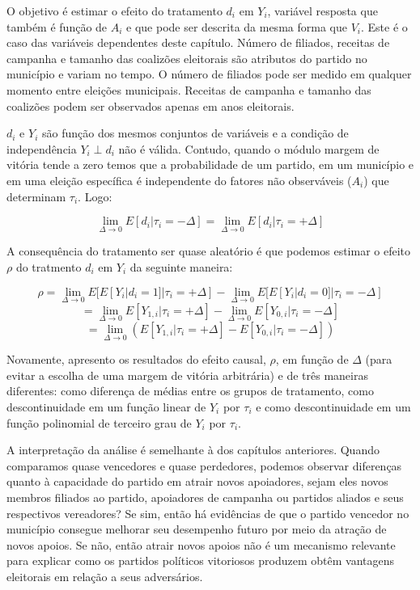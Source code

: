 O objetivo é estimar o efeito do tratamento $d_{i}$ em $Y_{i}$, variável resposta que também é função de $A_{i}$ e que pode ser descrita da mesma forma que $V_{i}$. Este é o caso das variáveis dependentes deste capítulo. Número de filiados, receitas de campanha e tamanho das coalizões eleitorais são atributos do partido no município e variam no tempo. O número de filiados pode ser medido em qualquer momento entre eleições municipais. Receitas de campanha e tamanho das coalizões podem ser observados apenas em anos eleitorais.

$d_{i}$ e $Y_{i}$ são função dos mesmos conjuntos de variáveis e a condição de independência $Y_{i} \perp d_{i}$ não é válida. Contudo,  quando o módulo margem de vitória tende a zero temos que a probabilidade de um partido, em um município e em uma eleição específica é independente do fatores não observáveis ($A_{i}$) que determinam $\tau_{i}$. Logo: 

\[
\lim_{\Delta \to 0} E[d_{i}|\tau_{i}=-\Delta]=\lim_{\Delta \to 0} E[d_{i}|\tau_{i}=+\Delta]
\]

A consequência do tratamento ser quase aleatório é que podemos estimar o efeito $\rho$ do tratmento $d_{i}$ em $Y_{i}$ da seguinte maneira:

\[\rho =\lim_{\Delta \to 0} E[E[Y_{i}|d_{i}=1]|\tau_{i}=+\Delta] - \lim_{\Delta \to 0} E[E[Y_{i}|d_{i}=0]|\tau_{i}=-\Delta]\]
\[=\lim_{\Delta \to 0} E[Y_{1,i}|\tau_{i}=+\Delta] - \lim_{\Delta \to 0} E[Y_{0,i}|\tau_{i}=-\Delta]\]
\[=\lim_{\Delta \to 0} (E[Y_{1,i}|\tau_{i}=+\Delta] - E[Y_{0,i}|\tau_{i}=-\Delta])\]

Novamente, apresento os resultados do efeito causal, $\rho$, em função de $\Delta$ (para evitar a escolha de uma margem de vitória arbitrária) e de três maneiras diferentes: como diferença de médias entre os grupos de tratamento, como descontinuidade em um função linear de $Y_{i}$ por $\tau_{i}$ e como descontinuidade em um função polinomial de terceiro grau de $Y_{i}$ por $\tau_{i}$.

A interpretação da análise é semelhante à dos capítulos anteriores. Quando comparamos quase vencedores e quase perdedores, podemos observar diferenças quanto à capacidade do partido em atrair novos apoiadores, sejam eles novos membros filiados ao partido, apoiadores de campanha ou partidos aliados e seus respectivos vereadores? Se sim, então há evidências de que o partido vencedor no município consegue melhorar seu desempenho futuro por meio da atração de novos apoios. Se não, então atrair novos apoios não é um mecanismo relevante para explicar como os partidos políticos vitoriosos produzem obtêm vantagens eleitorais em relação a seus adversários.

